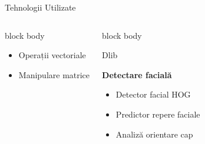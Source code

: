\documentclass[aspectratio=169,9pt]{beamer}
\begin{document}
\begin{frame}{Tehnologii Utilizate}
\begin{columns}[T]
\begin{beamercolorbox}[rounded=true,shadow=true,sep=0.7em]{block body}
\begin{center}
                                        \footnotesize
                                        \begin{itemize}[leftmargin=*]
                                                \setlength{\itemsep}{0pt}
                                                \item Operații vectoriale
                                                \item Manipulare matrice
                                        \end{itemize}
                                \end{center}
                        \end{beamercolorbox}
                        
                        \begin{beamercolorbox}[rounded=true,shadow=true,sep=0.7em]{block body}
                                \begin{center}
                                        {\fontsize{18}{18}\selectfont\textcolor{mainblue}{Dlib}}
                                        \vspace{0.1cm}
                                        
                                        \textbf{\small Detectare facială}
                                        \vspace{0.1cm}
                                        
                                        \footnotesize
                                        \begin{itemize}[leftmargin=*]
                                                \setlength{\itemsep}{0pt}
                                                \item Detector facial HOG
                                                \item Predictor repere faciale
                                                \item Analiză orientare cap
                                        \end{itemize}
                                \end{center}
                        \end{beamercolorbox}
                        
                        \vspace{0.3cm}
                        

\end{columns}
\end{frame}
\end{document}
